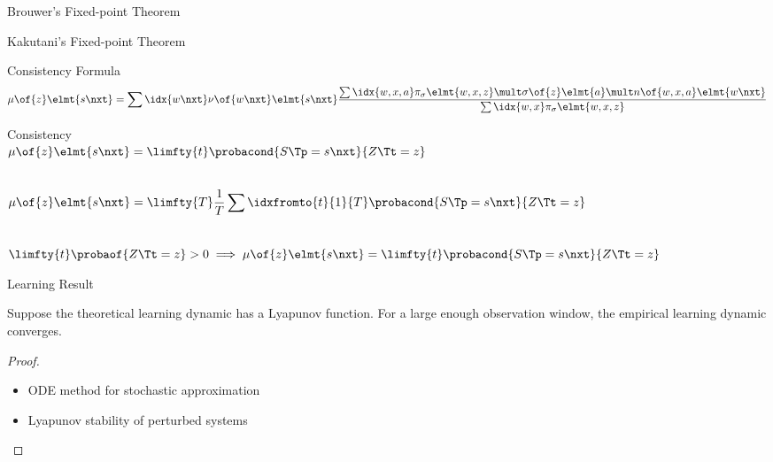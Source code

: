 {%
\begin{frame}{Brouwer's Fixed-point Theorem}
\end{frame}
\begin{frame}{Kakutani's Fixed-point Theorem}
\end{frame}
\begin{frame}{Consistency Formula}
\[
\mu \of {z} \elmt{s\nxt} = \sum\idx{w\nxt} \nu\of{w\nxt}\elmt{s\nxt} \frac{\sum\idx{w, x, a} \pi\strat{\sigma}\elmt{w,x,z} \mult \sigma \of{z} \elmt{a} \mult n \of{w,x,a} \elmt{w\nxt}}{\sum\idx{w, x} \pi\strat{\sigma}\elmt{w,x,z}}
\]
\end{frame}
\begin{frame}{Consistency}
\\\medskip
\qquad\(\displaystyle \mu\of{z}\elmt{s\nxt} = \limfty{t} \probacond{S\Tp = s\nxt}{Z\Tt = z}\)
\\\bigskip\bigskip

\newinthesis
\\\medskip
\qquad\(\displaystyle \mu\of{z}\elmt{s\nxt} = \limfty{T} \frac{1}{T} \sum\idxfromto{t}{1}{T} \probacond{S\Tp = s\nxt}{Z\Tt = z}\)
\\\bigskip\bigskip

\newinthesis
\\\medskip
\qquad\(\displaystyle \limfty{t} \probaof{Z\Tt = z} > 0 \implies \mu\of{z}\elmt{s\nxt} = \limfty{t} \probacond{S\Tp = s\nxt}{Z\Tt = z}\)
\end{frame}
\begin{frame}{Learning Result}
\begin{theorem}
Suppose the theoretical learning dynamic has a Lyapunov function.
For a large enough observation window, the empirical learning dynamic converges.
\end{theorem}

\begin{proof}
\begin{itemize}
\item ODE method for stochastic approximation
\item Lyapunov stability of perturbed systems
\end{itemize}
\end{proof}
\end{frame}
}
